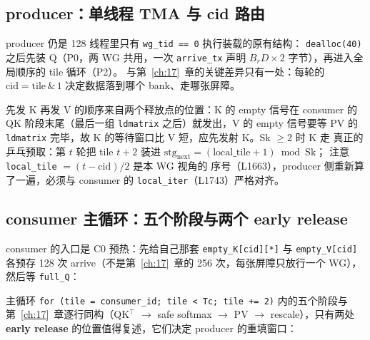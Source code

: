 \subsection{producer：单线程 TMA 与 cid 路由}

producer 仍是 128 线程里只有 \texttt{wg\_tid == 0} 执行装载的原有结构：
\texttt{dealloc(40)} 之后先装 Q（P0，两 WG 共用，一次 \texttt{arrive\_tx}
声明 $B_r D \times 2$ 字节），再进入全局顺序的 tile 循环（P2）。
与第~\ref{ch:17}~章的关键差异只有一处：每轮的
$\mathrm{cid} = \mathrm{tile}\,\&\,1$ 决定数据落到哪个 bank、走哪张屏障。





先发 K 再发 V 的顺序来自两个释放点的位置：K 的 empty 信号在 consumer 的 QK
阶段末尾（最后一组 \texttt{ldmatrix} 之后）就发出，V 的 empty 信号要等 PV 的
\texttt{ldmatrix} 完毕，故 K 的等待窗口比 V 短，应先发射 K。Sk $\ge 2$ 时 K 走
真正的乒乓预取：第 $t$ 轮把 tile $t+2$ 装进
$\mathrm{stg}_{\mathrm{next}} = (\mathrm{local\_tile}+1) \bmod \mathrm{Sk}$；
注意 \texttt{local\_tile} $= (t - \mathrm{cid})/2$ 是本 WG 视角的
序号（L1663），producer 侧重新算了一遍，必须与 consumer 的
\texttt{local\_iter}（L1743）严格对齐。

\subsection{consumer 主循环：五个阶段与两个 early release}

consumer 的入口是 C0 预热：先给自己那套 \texttt{empty\_\allowbreak{}K[cid][*]}
与 \texttt{empty\_\allowbreak{}V[cid]} 各预存 128 次 arrive（不是第~\ref{ch:17}~章的 256
次，每张屏障只放行一个 WG），然后等 \texttt{full\_Q}：



主循环 \texttt{for \allowbreak{}(tile =\allowbreak{} consumer\_\allowbreak{}id; tile \allowbreak{}< Tc; tile +=\allowbreak{} 2)} 内的五个阶段与
第~\ref{ch:17}~章逐行同构（QK$^\top$ $\to$ safe softmax $\to$ PV $\to$
rescale），只有两处 \textbf{early release} 的位置值得复述，它们决定 producer
的重填窗口：

